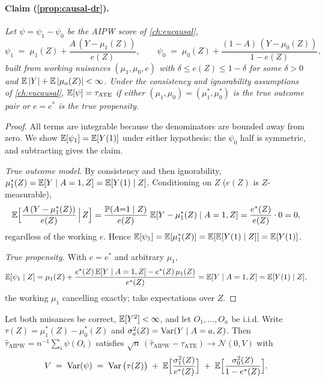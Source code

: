 \paragraph{Claim (\cref{prop:causal-dr}).}
\emph{Let $\psi = \psi_1 - \psi_0$ be the AIPW score of \cref{ch:eucausal},
\[
\psi_1 \;=\; \mu_1(Z) + \frac{A\,(Y - \mu_1(Z))}{e(Z)},
\qquad
\psi_0 \;=\; \mu_0(Z) + \frac{(1-A)\,(Y - \mu_0(Z))}{1 - e(Z)},
\]
built from working nuisances $(\mu_1, \mu_0, e)$ with $\delta \le e(Z) \le 1 - \delta$ for some
$\delta > 0$ and $\mathbb{E}\left|Y\right| + \mathbb{E}\left|\mu_a(Z)\right| < \infty$. Under the consistency and ignorability
assumptions of \cref{ch:eucausal}, $\mathbb{E}[\psi] = \tau_{\mathrm{ATE}}$ if either $(\mu_1, \mu_0) =
(\mu_1^*, \mu_0^*)$ is the true outcome pair or $e = e^*$ is the true propensity.}
\begin{proof}
All terms are integrable because the denominators are bounded away from zero. We show $\mathbb{E}[\psi_1] =
\mathbb{E}[Y(1)]$ under either hypothesis; the $\psi_0$ half is symmetric, and subtracting gives the claim.

\emph{True outcome model.} By consistency and then ignorability, $\mu_1^*(Z) = \mathbb{E}[Y \mid A=1, Z] =
\mathbb{E}[Y(1) \mid Z]$. Conditioning on $Z$ ($e(Z)$ is $Z$-measurable),
\[
\mathbb{E}\Big[\frac{A\,(Y - \mu_1^*(Z))}{e(Z)} \,\Big|\, Z\Big]
= \frac{\mathbb{P}(A{=}1 \mid Z)}{e(Z)}\;\mathbb{E}[Y - \mu_1^*(Z) \mid A=1, Z]
= \frac{e^*(Z)}{e(Z)} \cdot 0 = 0 ,
\]
regardless of the working $e$. Hence $\mathbb{E}[\psi_1] = \mathbb{E}[\mu_1^*(Z)] = \mathbb{E}[\mathbb{E}[Y(1) \mid Z]] = \mathbb{E}[Y(1)]$.

\emph{True propensity.} With $e = e^*$ and arbitrary $\mu_1$,
\[
\mathbb{E}[\psi_1 \mid Z]
= \mu_1(Z) + \frac{e^*(Z)\,\mathbb{E}[Y \mid A=1, Z] - e^*(Z)\,\mu_1(Z)}{e^*(Z)}
= \mathbb{E}[Y \mid A=1, Z] = \mathbb{E}[Y(1) \mid Z],
\]
the working $\mu_1$ cancelling exactly; take expectations over $Z$.
\end{proof}
\begin{proposition}
\label{app:pf:aipwvar}
Let both nuisances be correct, $\mathbb{E}[Y^2] < \infty$, and let $O_1, \dots, O_n$ be i.i.d. Write $\tau(Z)
= \mu_1^*(Z) - \mu_0^*(Z)$ and $\sigma_a^2(Z) = \operatorname{Var}(Y \mid A=a, Z)$. Then $\hat\tau_{\mathrm{AIPW}} =
n^{-1}\sum_i \psi(O_i)$ satisfies $\sqrt{n}\,(\hat\tau_{\mathrm{AIPW}} - \tau_{\mathrm{ATE}}) \to
\mathcal{N}(0, V)$ with
\[
V \;=\; \operatorname{Var}(\psi) \;=\; \operatorname{Var}\big(\tau(Z)\big)
\;+\; \mathbb{E}\Big[\frac{\sigma_1^2(Z)}{e^*(Z)}\Big]
\;+\; \mathbb{E}\Big[\frac{\sigma_0^2(Z)}{1 - e^*(Z)}\Big].
\]
\end{proposition}

